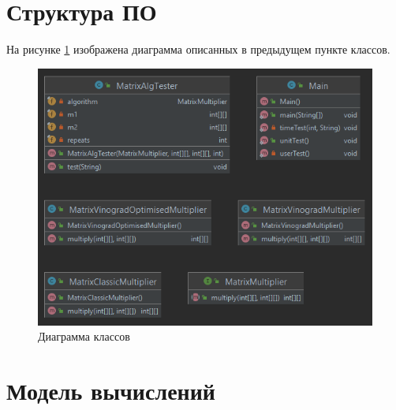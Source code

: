 \documentclass[12pt]{report}
\begin{document}
	\section{Структура ПО}
	На рисунке \ref{fig:uml} изображена диаграмма описанных в предыдущем пункте классов.
	
	\begin{figure}[H]
		\centering
		\includegraphics[width=0.85\linewidth]{img/uml}
		\caption{
			Диаграмма классов
		}
		\label{fig:uml}
	\end{figure}
	
    \section{Модель вычислений}
\end{document}
